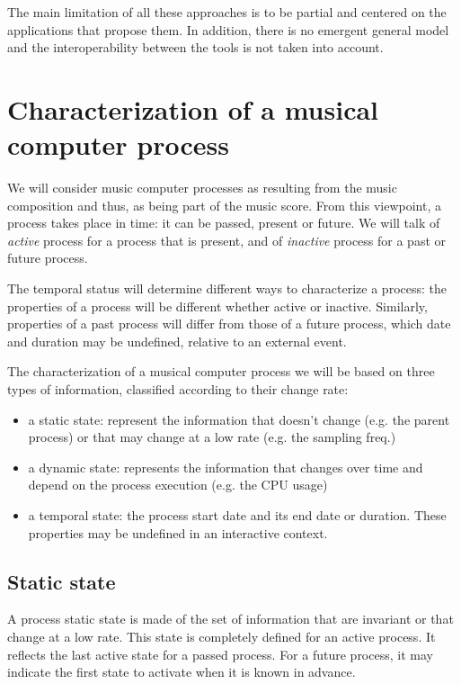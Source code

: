 \documentclass{article}
\begin{document}
The main limitation of all these approaches is to be partial and centered on the applications that propose them. In addition, there is no emergent general model and the interoperability between the tools is not taken into account.


\section{Characterization of a musical computer process}
We will consider music computer processes as resulting from the music composition and thus, as being part of the music score. From this viewpoint, a process takes place in time: it can be passed, present or future. We will talk of \emph{active} process for a process that is present, and of \emph{inactive} process for a past or future process.

The temporal status will determine different ways to characterize a process: the properties of a process will be different whether active or inactive. Similarly, properties of a past process will differ from those of a future process, which date and duration may be undefined, relative to an external event.

The characterization of a musical computer process we will be based on three types of information, classified according to their change rate:
\begin{itemize}%
\item a static state: represent the information that doesn't change (e.g. the parent process) or that may change at a low rate (e.g. the sampling freq.)
\item a dynamic state: represents the information that changes over time and depend on the process execution (e.g. the CPU usage)
\item a temporal state: the process start date and its end date or duration. These properties may be undefined in an interactive context.
\end{itemize}


\subsection{Static state}
A process static state is made of the set of information that are invariant or that change at a low rate. This state is completely defined for an active process. It reflects the last active state for a passed process. For a future process, it may indicate the first state to activate when it is known in advance.
\end{document}
